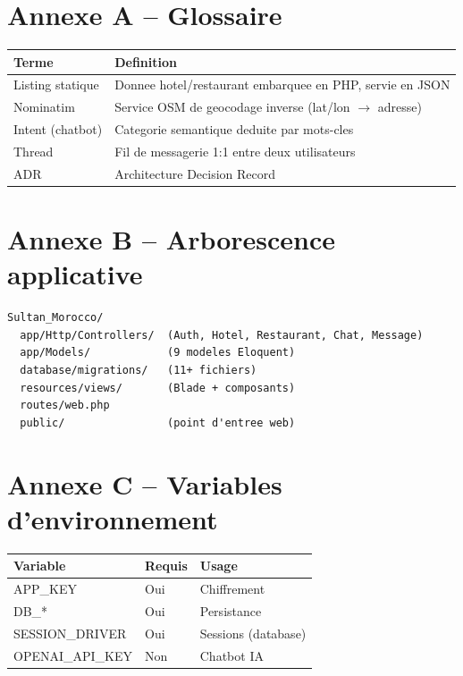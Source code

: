 \section*{Annexe A -- Glossaire}

\begin{table}[H]
\centering
\small
\begin{tabular}{@{}lp{10cm}@{}}
\toprule
\textbf{Terme} & \textbf{Definition} \\
\midrule
Listing statique & Donnee hotel/restaurant embarquee en PHP, servie en JSON \\
Nominatim & Service OSM de geocodage inverse (lat/lon $\rightarrow$ adresse) \\
Intent (chatbot) & Categorie semantique deduite par mots-cles \\
Thread & Fil de messagerie 1:1 entre deux utilisateurs \\
ADR & Architecture Decision Record \\
\bottomrule
\end{tabular}
\end{table}

\section*{Annexe B -- Arborescence applicative}

\begin{lstlisting}
Sultan_Morocco/
  app/Http/Controllers/  (Auth, Hotel, Restaurant, Chat, Message)
  app/Models/            (9 modeles Eloquent)
  database/migrations/   (11+ fichiers)
  resources/views/       (Blade + composants)
  routes/web.php
  public/                (point d'entree web)
\end{lstlisting}

\section*{Annexe C -- Variables d'environnement}

\begin{table}[H]
\centering
\begin{tabular}{@{}lll@{}}
\toprule
\textbf{Variable} & \textbf{Requis} & \textbf{Usage} \\
\midrule
APP\_KEY & Oui & Chiffrement \\
DB\_* & Oui & Persistance \\
SESSION\_DRIVER & Oui & Sessions (database) \\
OPENAI\_API\_KEY & Non & Chatbot IA \\
\bottomrule
\end{tabular}
\end{table}


